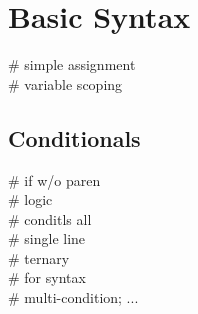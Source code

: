 \section{Basic Syntax}

 \# simple assignment \\
 \# variable scoping \\


\subsection*{Conditionals}
 \# if w/o paren \\
 \# logic \\
 \# condit\textquotesingle ls all \\
 \# single line \\
 \# ternary \\
 \# for syntax\\
 \# multi-condition; ...\\




